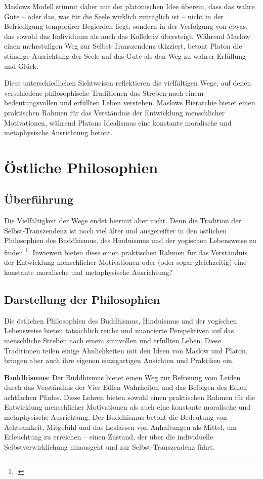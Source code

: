 \documentclass[12pt,a4paper]{article}
\begin{document}
Maslows Modell stimmt daher mit der platonischen Idee überein, dass das wahre Gute – oder das, was für die Seele wirklich zuträglich ist – nicht in der Befriedigung temporärer Begierden liegt, sondern in der Verfolgung von etwas, das sowohl das Individuum als auch das Kollektiv übersteigt. Während Maslow einen mehrstufigen Weg zur Selbst-Transzendenz skizziert, betont Platon die ständige Ausrichtung der Seele auf das Gute als den Weg zu wahrer Erfüllung und Glück.

Diese unterschiedlichen Sichtweisen reflektieren die vielfältigen Wege, auf denen verschiedene philosophische Traditionen das Streben nach einem bedeutungsvollen und erfüllten Leben verstehen. Maslows Hierarchie bietet einen praktischen Rahmen für das Verständnis der Entwicklung menschlicher Motivationen, während Platons Idealismus eine konstante moralische und metaphysische Ausrichtung betont.

\section{Östliche Philosophien}
\subsection[short]{Überführung}
Die Vielfältigkeit der Wege endet hiermit aber nicht. Denn die Tradition der Selbst-Transzendenz ist noch viel älter und ausgereifter in den östlichen Philosophien des Buddhismus, des Hinduismus und der yogischen Lebensweise zu finden \footcite{rahula1974, flood1996, feuerstein2001}. Inwieweit bieten diese einen praktischen Rahmen für das Verständnis der Entwicklung menschlicher Motivationen oder (oder sogar gleichzeitig) eine konstante moralische
und metaphysische Ausrichtung?

\subsection[short]{Darstellung der Philosophien}
Die östlichen Philosophien des Buddhismus, Hinduismus und der yogischen Lebensweise bieten tatsächlich reiche und nuancierte Perspektiven auf das menschliche Streben nach einem sinnvollen und erfüllten Leben. Diese Traditionen teilen einige Ähnlichkeiten mit den Ideen von Maslow und Platon, bringen aber auch ihre eigenen einzigartigen Ansichten und Praktiken ein.

\textbf{Buddhismus}:
Der Buddhismus bietet einen Weg zur Befreiung vom Leiden durch das Verständnis der Vier Edlen Wahrheiten und das Befolgen des Edlen achtfachen Pfades. Diese Lehren bieten sowohl einen praktischen Rahmen für die Entwicklung menschlicher Motivationen als auch eine konstante moralische und metaphysische Ausrichtung. Der Buddhismus betont die Bedeutung von Achtsamkeit, Mitgefühl und das Loslassen von Anhaftungen als Mittel, um Erleuchtung zu erreichen – einen Zustand, der über die individuelle Selbstverwirklichung hinausgeht und zur Selbst-Transzendenz führt.
\end{document}
